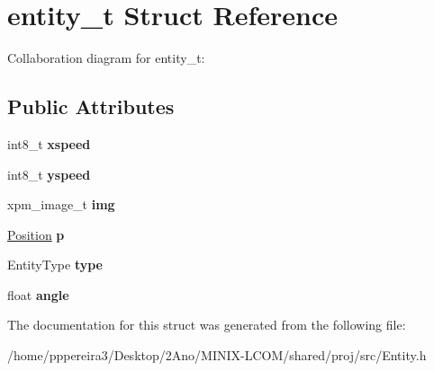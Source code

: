 \hypertarget{structentity__t}{}\section{entity\+\_\+t Struct Reference}
\label{structentity__t}


Collaboration diagram for entity\+\_\+t\+:
\subsection*{Public Attributes}
\begin{DoxyCompactItemize}
\item 
int8\+\_\+t {\bfseries xspeed}
\item 
int8\+\_\+t {\bfseries yspeed}
\item 
xpm\+\_\+image\+\_\+t {\bfseries img}
\item 
\hyperlink{structposition__t}{Position} {\bfseries p}
\item 
Entity\+Type {\bfseries type}
\item 
float {\bfseries angle}
\end{DoxyCompactItemize}


The documentation for this struct was generated from the following file\+:\begin{DoxyCompactItemize}
\item 
/home/pppereira3/\+Desktop/2\+Ano/\+M\+I\+N\+I\+X-\/\+L\+C\+O\+M/shared/proj/src/Entity.\+h\end{DoxyCompactItemize}
